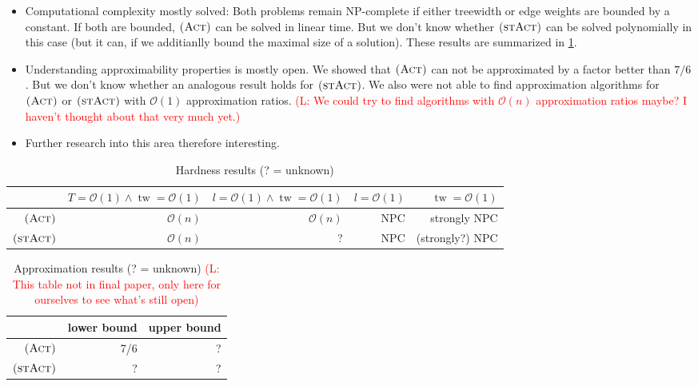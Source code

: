 \documentclass[10pt,a4paper]{article}
\numberwithin{equation}{section}
\newcommand{\comment}[1]{\textcolor{red}{(L: #1)}}
\newcommand{\bigO}{\mathcal{O}}
\newcommand{\act}{\textsc{(Act)}}
\newcommand{\stact}{\textsc{(stAct)}}
\DeclareMathOperator{\tw}{tw}
\begin{document}
\begin{itemize}
\item Computational complexity mostly solved: Both problems remain NP-complete if either treewidth or edge weights are bounded by a constant. If both are bounded, $\act$ can be solved in linear time. But we don't know whether $\stact$ can be solved polynomially in this case (but it can, if we additianlly bound the maximal size of a solution). These results are summarized in \cref{table_complexity}.
\item Understanding approximability properties is mostly open. We showed that $\act$ can not be approximated by a factor better than $7/6$. But we don't know whether an analogous result holds for $\stact$. We also were not able to find approximation algorithms for $\act$ or $\stact$ with $\bigO(1)$ approximation ratios. \comment{We could try to find algorithms with $\bigO(n)$ approximation ratios maybe? I haven't thought about that very much yet.}
\item Further research into this area therefore interesting.
\end{itemize}


\begin{table}
\begin{tabular}{r|rrrr}
& $T = \bigO(1) \land \tw = \bigO(1)$ & $l = \bigO(1) \land \tw = \bigO(1)$ & $l = \bigO(1)$ & $\tw = \bigO(1)$\\
\hline
$\act$ & $\bigO(n)$ & $\bigO(n)$ & NPC & strongly NPC \\
$\stact$ & $\bigO(n)$ & ? & NPC & (strongly?) NPC \\
\end{tabular}
\caption{Hardness results (? = unknown)}
\label{table_complexity}
\end{table}

\begin{table}
\begin{tabular}{r|rr}
& lower bound & upper bound \\
\hline
$\act$ & 7/6 & ?  \\
$\stact$ & ? & ? \\
\end{tabular}
\caption{Approximation results (? = unknown) \comment{This table not in final paper, only here for ourselves to see what's still open}}
\end{table}
\end{document}
